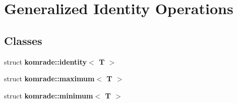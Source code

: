 \section{Generalized Identity Operations}
\label{group__generalized__identity__operations}
\subsection*{Classes}
\begin{CompactItemize}
\item 
struct {\bf komrade::identity$<$ T $>$}
\item 
struct {\bf komrade::maximum$<$ T $>$}
\item 
struct {\bf komrade::minimum$<$ T $>$}
\end{CompactItemize}
